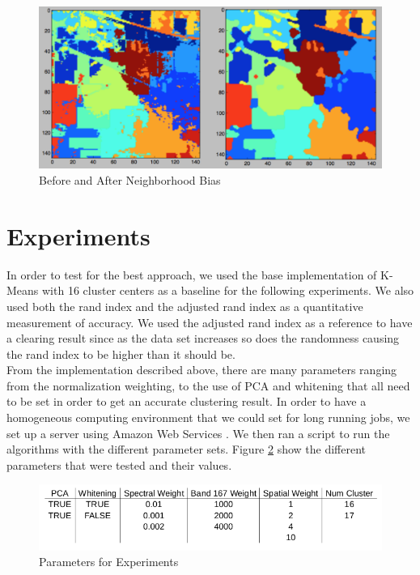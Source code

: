 \documentclass[journal]{IEEEtran}
\begin{document}
    \begin{figure}[h!]
      \centering\includegraphics[width=\columnwidth]{images/BandUnB.png}
      \caption{Before and After Neighborhood Bias}
      \label{fig:NeighborhoodBias}
    \end{figure}

\section{Experiments}
  In order to test for the best approach, we used the base implementation of K-Means with 16 cluster centers as a baseline for the following experiments. We also used both the rand index and the adjusted rand index as a quantitative measurement of accuracy. We used the adjusted rand index as a reference to have a clearing result since as the data set increases so does the randomness causing the rand index to be higher than it should be.\\

  From the implementation described above, there are many parameters ranging from the normalization weighting, to the use of PCA and whitening that all need to be set in order to get an accurate clustering result. In order to have a homogeneous computing environment that we could set for long running jobs, we set up a server using Amazon Web Services \cite{AWS}. We then ran a script to run the algorithms with the different parameter sets. Figure \ref{fig:Parameters} show the different parameters that were tested and their values.\\

  \begin{figure}[h!]
    \centering\includegraphics[width=\columnwidth]{images/parameters.png}
    \caption{Parameters for Experiments}
    \label{fig:Parameters}
  \end{figure}
\end{document}
